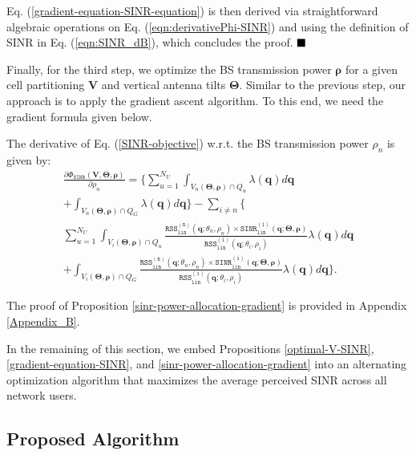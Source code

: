 Eq. (\ref{gradient-equation-SINR-equation}) is then derived via straightforward algebraic operations on Eq. (\ref{eqn:derivativePhi-SINR}) and using the definition of SINR in Eq. (\ref{eqn:SINR_dB}), which concludes the proof. $\hfill\blacksquare$


Finally, for the third step, we optimize the BS transmission power $\bm{\rho}$ for a given cell partitioning $\bm{V}$ and vertical antenna tilts $\bm{\Theta}$. Similar to the previous step, our approach is to apply the gradient ascent algorithm. To this end, we need the gradient formula given below.
\begin{Proposition}\label{sinr-power-allocation-gradient}
The derivative of Eq. (\ref{SINR-objective}) w.r.t. the BS transmission power $\rho_n$ is given by:
\begin{multline}\label{sinr-power-allocation-gradient-equation}
     \frac{\partial \Phi_{\mathtt{SINR}}(\bm{V}, \bm{\Theta}, \bm{\rho})}{\partial \rho_n} =   \Bigg\{ \sum_{u=1}^{N_U} \int_{V_n(\mathbf{\Theta}, \bm{\rho})\cap Q_u}   \lambda(\bm{q}) d\bm{q}  
    \\+  \int_{V_n(\mathbf{\Theta}, \bm{\rho})\cap Q_G}  \lambda(\bm{q}) d\bm{q} \Bigg\}   - \sum_{i\neq n}^{}  \Bigg\{ \\ \sum_{u=1}^{N_U} \int_{V_i(\mathbf{\Theta}, \bm{\rho})\cap Q_u} \!\!\!\!\!\!\!\!\! \!\!\!\!\frac{\mathtt{RSS_{lin}^{(n)}}(\bm{q};\theta_n,\rho_n) \times \mathtt{SINR_{lin}^{(i)}}(\bm{q}; \bm{\Theta},\bm{\rho})}{\mathtt{RSS_{lin}^{(i)}}(\bm{q};\theta_i,\rho_i)} \lambda(\bm{q}) d\bm{q}
    \\+ \int_{V_i(\mathbf{\Theta}, \bm{\rho})\cap Q_G} \!\!\!\!\!\!\!\!\!\!\!\!\! \frac{\mathtt{RSS_{lin}^{(n)}}(\bm{q};\theta_n,\rho_n) \times \mathtt{SINR_{lin}^{(i)}}(\bm{q}; \bm{\Theta},\bm{\rho})}{\mathtt{RSS_{lin}^{(i)}}(\bm{q};\theta_i,\rho_i)} \lambda(\bm{q}) d\bm{q} \Bigg\}.
\end{multline}
\end{Proposition}
The proof of Proposition \ref{sinr-power-allocation-gradient} is provided in Appendix \ref{Appendix_B}.



In the remaining of this section, we embed Propositions \ref{optimal-V-SINR}, \ref{gradient-equation-SINR}, and \ref{sinr-power-allocation-gradient} into an alternating optimization algorithm that maximizes the average perceived SINR across all network users.


\subsection{Proposed Algorithm}\label{SINR-Algorithm}

